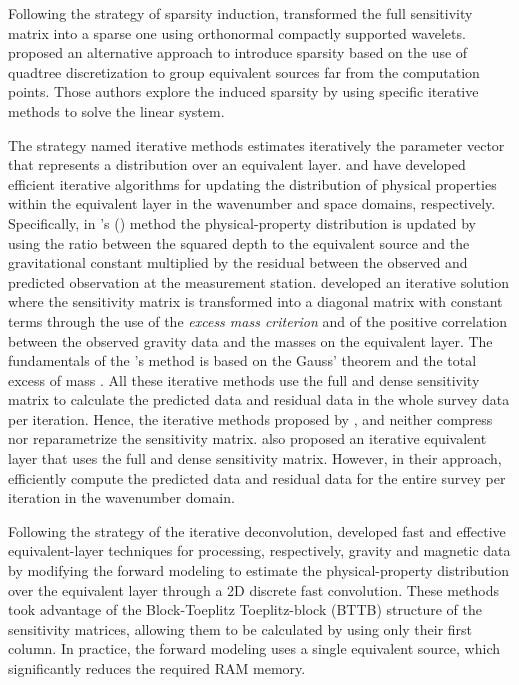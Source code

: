 Following the strategy of sparsity induction, 
\cite{li-oldenburg2010} transformed the full sensitivity matrix into a sparse one using orthonormal compactly supported wavelets. 
\cite{barnes-lumley2011} proposed an alternative approach to introduce sparsity based on the use of 
quadtree discretization to group equivalent sources far from the computation points.
Those authors explore the induced sparsity by using specific iterative methods to solve the linear system.

The strategy named iterative methods estimates iteratively the parameter vector that represents a distribution over an equivalent layer.
\cite{xia-sprowl1991} and \cite{xia-etal1993} have developed efficient iterative algorithms 
for updating the distribution of physical properties within the equivalent layer in the wavenumber and space domains, respectively.
Specifically, in \citeauthor{xia-sprowl1991}'s (\citeyear{xia-sprowl1991}) method the physical-property distribution is updated by using the ratio between the squared depth to the equivalent source and the gravitational constant multiplied by the residual between the observed and predicted observation at the measurement station. 
\cite{siqueira-etal2017} developed an iterative solution where the sensitivity matrix is transformed into a diagonal matrix with constant terms through the use of the \textit{excess mass criterion} and of the positive correlation between the observed gravity data and the masses on the equivalent layer.
The fundamentals of the \citeauthor{siqueira-etal2017}'s method
is  based on the Gauss' theorem \cite[e.g.,][p. 43]{kellogg1967} and the total excess of mass \cite[e.g.,][p. 60]{blakely1996}.
All these iterative methods use the full and dense sensitivity matrix to calculate the predicted data 
and residual data in the whole survey data per iteration.
Hence, the iterative methods proposed by \cite{xia-sprowl1991}, \cite{xia-etal1993} and 
\cite{siqueira-etal2017} neither compress nor reparametrize the sensitivity  matrix.
\cite{jirigalatu-ebbing2019} also proposed an iterative equivalent layer that uses the full and dense sensitivity matrix. 
However, in their approach, \cite{jirigalatu-ebbing2019}  efficiently compute  the predicted data and 
residual data for the entire survey per iteration in the wavenumber domain.

Following the strategy of the  iterative deconvolution, \citet{takahashi-etal2020,takahashi-etal2022}
developed fast and effective equivalent-layer techniques for processing, respectively, gravity and magnetic data by modifying the forward modeling to 
estimate the physical-property distribution over the equivalent layer through a 2D discrete fast convolution.
These methods took advantage of the Block-Toeplitz Toeplitz-block (BTTB) structure of the sensitivity matrices, allowing them to be calculated by 
using only their first column.
In practice, the forward modeling uses a single equivalent source, which significantly reduces the required RAM memory. 

